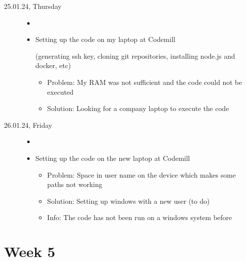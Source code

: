 \documentclass[a4, 11pt]{scrartcl}
\begin{document}
\begin{description}
\item[25.01.24, Thursday]
\begin{itemize}
	\item[]
	\item Setting up the code on my laptop at Codemill 
	
	(generating ssh key, cloning git repositories, installing node.js and docker, etc)
	\begin{itemize}
		\item Problem: My RAM was not sufficient and the code could not be executed
		\item Solution: Looking for a company laptop to execute the code
	\end{itemize}
\end{itemize}


















\item[26.01.24, Friday]
\begin{itemize}
	\item[]
	\item Setting up the code on the new laptop at Codemill
	\begin{itemize}
		\item Problem: Space in user name on the device which makes some paths not working
		\item Solution: Setting up windows with a new user (to do)
		\item Info: The code has not been run on a windows system before
	\end{itemize}
\end{itemize}

	\end{description}









\newpage
\section*{Week 5}
\end{document}
